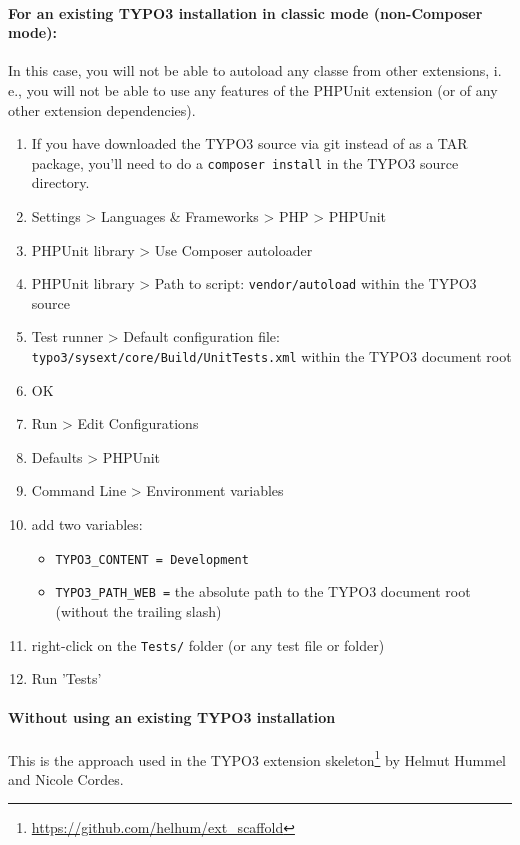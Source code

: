 \documentclass[a4paper,10pt,headsepline]{scrartcl}
\begin{document}
\paragraph{For an existing TYPO3 installation in classic mode (non-Composer mode):}

In this case, you will not be able to autoload any classe from other extensions, i.\,e., you will not be able to use any features of the PHPUnit extension (or of any other extension dependencies).

\begin{enumerate}
  \item If you have downloaded the TYPO3 source via git instead of as a TAR package, you'll need to do a \texttt{composer install} in the TYPO3 source directory.
  \item Settings > Languages \& Frameworks > PHP > PHPUnit
  \item PHPUnit library > Use Composer autoloader
  \item PHPUnit library > Path to script: \texttt{vendor/autoload} within the TYPO3 source
  \item Test runner > Default configuration file: \texttt{typo3/sysext/core/Build/UnitTests.xml} within the TYPO3 document root
  \item OK
  \item Run > Edit Configurations
  \item Defaults > PHPUnit
  \item Command Line > Environment variables
  \item add two variables:
    \begin{itemize}
      \item \texttt{TYPO3\_CONTENT = Development}
      \item \texttt{TYPO3\_PATH\_WEB =} the absolute path to the TYPO3 document root (without the trailing slash)
    \end{itemize}
  \item right-click on the \texttt{Tests/} folder (or any test file or folder)
  \item Run 'Tests'
\end{enumerate}


\paragraph{Without using an existing TYPO3 installation}

This is the approach used in the TYPO3 extension skeleton\footnote{\url{https://github.com/helhum/ext_scaffold}} by Helmut Hummel and Nicole Cordes.
\end{document}
